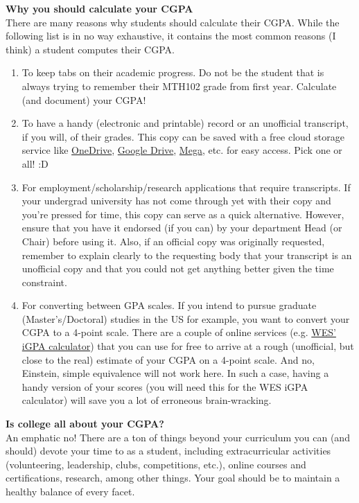 \documentclass[letter]{article}
\begin{document}
\sffamily
\textbf{Why you should calculate your CGPA}\\
\normalfont
There are many reasons why students should calculate their CGPA. While the following list is in no way exhaustive, it contains the most common reasons (I think) a student computes their CGPA.
\begin{enumerate}
	\item To keep tabs on their academic progress. Do not be the student that is always trying to remember their MTH102 grade from first year. Calculate (and document) your CGPA!
	\item To have a handy (electronic and printable) record or an unofficial transcript, if you will, of their grades. This copy can be saved with a free cloud storage service like \href{https://onedrive.live.com/about/en-us/signin/}{OneDrive}, \href{https://www.google.com/drive/}{Google Drive}, \href{https://mega.io/}{Mega}, etc. for easy access. Pick one or all! :D
	\item For employment/scholarship/research applications that require transcripts. If your undergrad university has not come through yet with their copy and you're pressed for time, this copy can serve as a quick alternative. However, ensure that you have it endorsed (if you can) by your department Head (or Chair) before using it. Also, if an official copy was originally requested, remember to explain clearly to the requesting body that your transcript is an unofficial copy and that you could not get anything better given the time constraint.
	\item For converting between GPA scales. If you intend to pursue graduate (Master's/Doctoral) studies in the US for example, you want to convert your CGPA to a 4-point scale. There are a couple of online services (e.g. \href{https://applications.wes.org/igpa-calculator/}{WES' iGPA calculator}) that you can use for free to arrive at a rough (unofficial, but close to the real) estimate of your CGPA on a 4-point scale. And no, Einstein, simple equivalence will not work here. In such a case, having a handy version of your scores (you will need this for the WES iGPA calculator) will save you a lot of erroneous brain-wracking.

\end{enumerate}

\sffamily
\textbf{Is college all about your CGPA?}\\
\normalfont
An emphatic no! There are a ton of things beyond your curriculum you can (and should) devote your time to as a student, including extracurricular activities (volunteering, leadership, clubs, competitions, etc.), online courses and certifications, research, among other things. Your goal should be to maintain a healthy balance of every facet.
\end{document}
